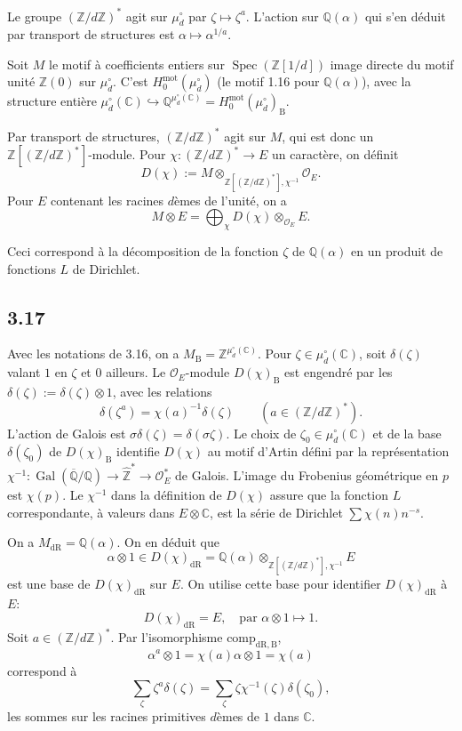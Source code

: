 \documentclass[12pt,a4paper]{article}
\theoremstyle{plain}
\theoremstyle{definition}
\theoremstyle{remark}
\DeclareMathOperator{\Spec}{Spec}
\DeclareMathOperator{\Gal}{Gal}
\newcommand{\DR}{\mathrm{dR}}
\newcommand{\B}{\mathrm{B}}
\newcommand{\mot}{\mathrm{mot}}
\newcommand{\OO}{\mathcal{O}}
\newcommand{\Z}{\mathbb{Z}}
\newcommand{\Q}{\mathbb{Q}}
\newcommand{\C}{\mathbb{C}}
\begin{document}
Le groupe $(\Z/d\Z)^*$ agit sur $\mu_d^\circ$ par $\zeta \mapsto \zeta^a$. L'action sur $\Q(\alpha)$ qui s'en d\'eduit par transport de structures est $\alpha \mapsto \alpha^{1/a}$.

Soit $M$ le motif \`a coefficients entiers sur $\Spec(\Z[1/d])$ image directe du motif unit\'e $\Z(0)$ sur $\mu_d^\circ$. C'est $H^{\mot}_0(\mu_d^\circ)$ (le motif 1.16 pour $\Q(\alpha)$), avec la structure enti\`ere $\mu_d^\circ(\C) \hookrightarrow \Q^{\mu_d^\circ(\C)} = H^{\mot}_0(\mu_d^\circ)_{\B}$.

Par transport de structures, $(\Z/d\Z)^*$ agit sur $M$, qui est donc un $\Z[(\Z/d\Z)^*]$-module. Pour $\chi: (\Z/d\Z)^* \to E$ un caract\`ere, on d\'efinit
\[
D(\chi) := M \mathop{\otimes}_{\Z[(\Z/d\Z)^*],\chi^{-1}} \OO_E.
\]
Pour $E$ contenant les racines $d$\`emes de l'unit\'e, on a
\[
M \otimes E = \bigoplus_\chi D(\chi) \otimes_{\OO_E} E.
\]

Ceci correspond \`a la d\'ecomposition de la fonction $\zeta$ de $\Q(\alpha)$ en un produit de fonctions $L$ de Dirichlet.

\subsection*{3.17}

Avec les notations de 3.16, on a $M_{\B} = \Z^{\mu_d^\circ(\C)}$. Pour $\zeta \in \mu_d^\circ(\C)$, soit $\delta(\zeta)$ valant $1$ en $\zeta$ et $0$ ailleurs. Le $\OO_E$-module $D(\chi)_{\B}$ est engendr\'e par les $\delta(\zeta) := \delta(\zeta) \otimes 1$, avec les relations
\begin{equation*}\tag{3.17.1}
\delta(\zeta^a) = \chi(a)^{-1}\delta(\zeta) \qquad (a \in (\Z/d\Z)^*).
\end{equation*}
L'action de Galois est $\sigma\delta(\zeta) = \delta(\sigma\zeta)$. Le choix de $\zeta_0 \in \mu_d^\circ(\C)$ et de la base $\delta(\zeta_0)$ de $D(\chi)_{\B}$ identifie $D(\chi)$ au motif d'Artin d\'efini par la repr\'esentation $\chi^{-1}: \Gal(\overline{\Q}/\Q) \to \hat{\Z}^* \to \OO_E^*$ de Galois. L'image du Frobenius g\'eom\'etrique en $p$ est $\chi(p)$. Le $\chi^{-1}$ dans la d\'efinition de $D(\chi)$ assure que la fonction $L$ correspondante, \`a valeurs dans $E \otimes \C$, est la s\'erie de Dirichlet $\sum \chi(n)n^{-s}$.

On a $M_{\DR} = \Q(\alpha)$. On en d\'eduit que
\[
\alpha \otimes 1 \in D(\chi)_{\DR} = \Q(\alpha) \mathop{\otimes}_{\Z[(\Z/d\Z)^*],\chi^{-1}} E
\]
est une base de $D(\chi)_{\DR}$ sur $E$. On utilise cette base pour identifier $D(\chi)_{\DR}$ \`a $E$:
\begin{equation*}\tag{3.17.2}
D(\chi)_{\DR} = E, \quad \text{par } \alpha \otimes 1 \mapsto 1.
\end{equation*}
Soit $a \in (\Z/d\Z)^*$. Par l'isomorphisme $\mathrm{comp}_{\DR,\B}$,
\[
\alpha^a \otimes 1 = \chi(a)\alpha \otimes 1 = \chi(a)
\]
correspond \`a
\begin{equation*}\tag{3.17.3}
\sum_\zeta \zeta^a \delta(\zeta) = \sum_\zeta \zeta \chi^{-1}(\zeta)\delta(\zeta_0),
\end{equation*}
les sommes sur les racines primitives $d$\`emes de $1$ dans $\C$.
\end{document}
